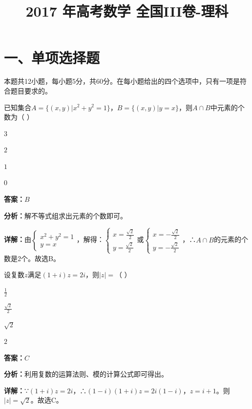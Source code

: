 ﻿\title{2017 年高考数学 全国III卷-理科}
\date{}
\maketitle

\section*{一、单项选择题}
本题共12小题，每小题5分，共60分。在每小题给出的四个选项中，只有一项是符合题目要求的。

\begin{question}[points=5]
已知集合$A=\{(x,y)|x^2+y^2=1\}$，$B=\{(x,y)|y=x\}$，则$A\cap B$中元素的个数为（ ）
\begin{choices}
  \item $3$
  \item $2$
  \item $1$
  \item $0$
\end{choices}
\begin{solution}
\textbf{答案：}$B$

\textbf{分析：}解不等式组求出元素的个数即可。

\textbf{详解：}由$\begin{cases} x^2+y^2=1 \\ y=x \end{cases}$，解得：$\begin{cases} x=\frac{\sqrt{2}}{2} \\ y=\frac{\sqrt{2}}{2} \end{cases}$或$\begin{cases} x=-\frac{\sqrt{2}}{2} \\ y=-\frac{\sqrt{2}}{2} \end{cases}$，∴$A\cap B$的元素的个数是2个。故选B。
\end{solution}
\end{question}

\begin{question}[points=5]
设复数$z$满足$(1+i)z=2i$，则$|z|=$（ ）
\begin{choices}
  \item $\frac{1}{2}$
  \item $\frac{\sqrt{2}}{2}$
  \item $\sqrt{2}$
  \item $2$
\end{choices}
\begin{solution}
\textbf{答案：}$C$

\textbf{分析：}利用复数的运算法则、模的计算公式即可得出。

\textbf{详解：}∵$(1+i)z=2i$，∴$(1-i)(1+i)z=2i(1-i)$，$z=i+1$。则$|z|=\sqrt{2}$。故选C。
\end{solution}
\end{question}

